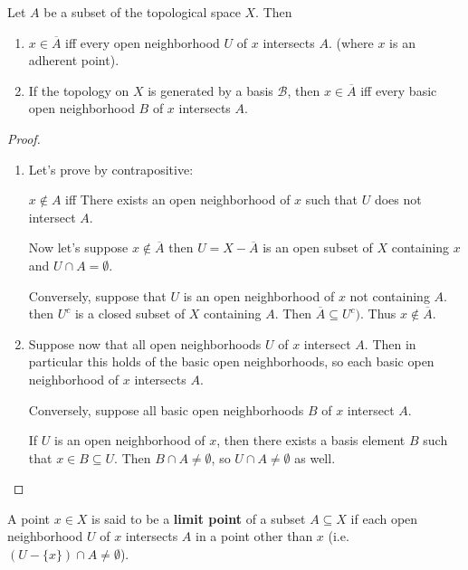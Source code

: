 \documentclass[12pt, twosided]{article}
\begin{document}
  \begin{thm}
    Let \(A\) be a subset of the topological space \(X\). Then

    \begin{enumerate}
    \item \(x \in \overline{A}\) iff every open neighborhood \(U\) of \(x\) intersects \(A\). (where \(x\) is an adherent point).
    \item If the topology on \(X\) is generated by a basis \(\mathcal{B}\), then \(x \in \overline{A}\) iff every basic open neighborhood \(B\) of \(x\) intersects \(A\).
    \end{enumerate}
  \end{thm}

  \begin{proof}
    \begin{enumerate}
    \item Let's prove by contrapositive:

      \(x \not\in A\) iff There exists an open neighborhood of \(x\) such that \(U\) does not intersect \(A\).

      Now let's suppose \(x \not\in \overline{A}\) then \(U = X - \overline{A}\) is an open subset of \(X\) containing \(x\) and \(U \cap A = \emptyset\).

      Conversely, suppose that \(U\) is an open neighborhood of \(x\) not containing \(A\). then \(U^c\) is a closed subset of \(X\) containing \(A\). Then \(\overline{A} \subseteq U^c)\). Thus \(x \not\in \overline{A}\). \partdone
    \item Suppose now that all open neighborhoods \(U\) of \(x\) intersect \(A\). Then in particular this holds of the basic open neighborhoods, so each basic open neighborhood of \(x\) intersects \(A\).

      Conversely, suppose all basic open neighborhoods \(B\) of \(x\) intersect \(A\).

      If \(U\) is an open neighborhood of \(x\), then there exists a basis element \(B\) such that \(x\in B \subseteq U\). Then \(B \cap A \neq \emptyset\), so \(U \cap A \neq \emptyset\) as well.
    \end{enumerate}
  \end{proof} 

  \begin{df}
    A point \(x \in X\) is said to be a \textbf{limit point} of a subset \(A \subseteq X\) if each open neighborhood \(U\) of \(x\) intersects \(A\) in a point other than \(x\) (i.e. \((U - \{x\}) \cap A \neq \emptyset\)).
  \end{df}
\end{document}
